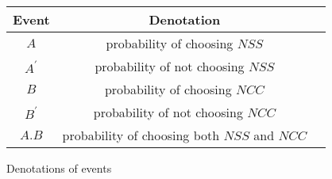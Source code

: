 


    
    \begin{tabular}{|c|c|c|}
    \hline
    Event & Denotation\\
        \hline 
        $A$ & probability of choosing $NSS$ \\
        \hline
        $A^\prime$ & probability of not choosing $NSS$\\
        \hline
       $B$ & probability of choosing $NCC$ \\
        \hline
       $B^\prime$ & probability of not choosing $NCC$ \\
        \hline
        $A.B$ & probability of choosing both $NSS$ and $NCC$\\
        \hline
    \end{tabular}
    \caption{Denotations of events}
    


